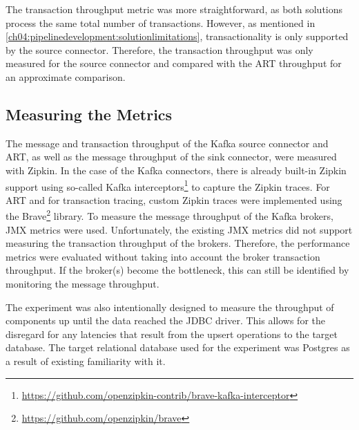 The transaction throughput metric was more straightforward, as both solutions process the same total number of transactions. However, as mentioned in \ref{ch04:pipelinedevelopment:solutionlimitations}, transactionality is only supported by the source connector. Therefore, the transaction throughput was only measured for the source connector and compared with the \ac{ART} throughput for an approximate comparison.

\subsection{Measuring the Metrics}
The message and transaction throughput of the Kafka source connector and \ac{ART}, as well as the message throughput of the sink connector, were measured with Zipkin. In the case of the Kafka connectors, there is already built-in Zipkin support using so-called Kafka interceptors\footnote{\url{https://github.com/openzipkin-contrib/brave-kafka-interceptor}} to capture the Zipkin traces. For \ac{ART} and for transaction tracing, custom Zipkin traces were implemented using the Brave\footnote{\url{https://github.com/openzipkin/brave}} library. To measure the message throughput of the Kafka brokers, \ac{JMX} metrics were used. Unfortunately, the existing \ac{JMX} metrics did not support measuring the transaction throughput of the brokers. Therefore, the performance metrics were evaluated without taking into account the broker transaction throughput. If the broker(s) become the bottleneck, this can still be identified by monitoring the message throughput.


The experiment was also intentionally designed to measure the throughput of components up until the data reached the \ac{JDBC} driver. This allows for the disregard for any latencies that result from the upsert operations to the target database. The target relational database used for the experiment was Postgres as a result of existing familiarity with it.

